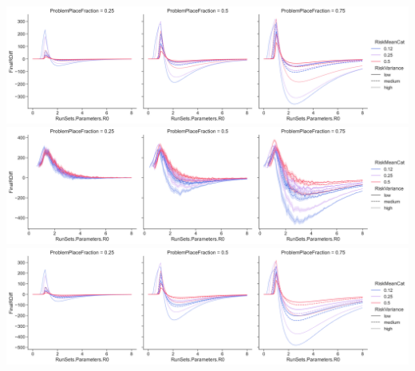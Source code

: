 \includegraphics{images/FinalR.png}
\includegraphics{images/FinalRSim.png}
\includegraphics{images/FinalRDifference.png}
